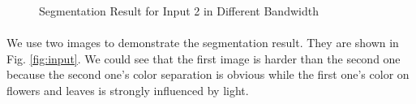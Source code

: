\documentclass{gapd}
\begin{document}
\begin{figure}[ht]
	\centering
	\caption{Segmentation Result for Input 2 in Different Bandwidth}
	\label{fig:different_bandwidth_input_2}
\end{figure}	
\paragraph{}
	\lettrine{W}{}e use two images to demonstrate the segmentation result. They are shown in Fig. \ref{fig:input}. We could see that the first image is harder than the second one because the second one's color separation is obvious while the first one's color on flowers and leaves is strongly influenced by light. 
\end{document}
